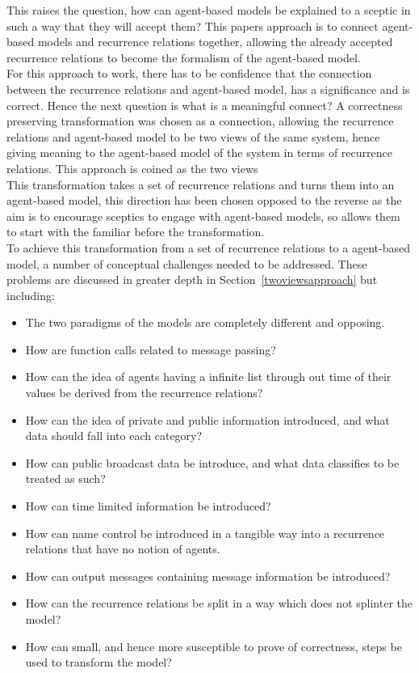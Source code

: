\documentclass{article}
\begin{document}
This raises the question, how can agent-based models be explained to a sceptic in such a way that they will accept them? This papers approach is to connect agent-based models and recurrence relations together, allowing the already accepted recurrence relations to become the formalism of the agent-based model.\\ 
For this approach to work, there has to be confidence that the connection between the recurrence relations and agent-based model, has a significance and is correct. Hence the next question is what is a meaningful connect? A correctness preserving transformation was chosen as a connection, allowing the recurrence relations and agent-based model to be two views of the same system, hence giving meaning to the agent-based model of the system in terms of recurrence relations. This approach is coined as the two views \\    
This transformation takes a set of recurrence relations and turns them into an agent-based model, this direction has been chosen opposed to the reverse as the aim is to encourage sceptics to engage with agent-based models, so allows them to start with the familiar before the transformation.\\ 
To achieve this transformation from a set of recurrence relations to a agent-based model, a number of conceptual challenges needed to be addressed. These problems are discussed in greater depth in Section~\ref{twoviewsapproach} but including: 
\begin{itemize}
   \item The two paradigms of the models are completely different and opposing. 
   \item How are function calls related to message passing?
   \item How can the idea of agents having a infinite list through out time of their values be derived from the recurrence relations? 
   \item How can the idea of private and public information introduced, and what data should fall into each category? 
   \item How can public broadcast data be introduce, and what data classifies to be treated as such? 
   \item How can time limited information be introduced?
   \item How can name control be introduced in a tangible way into a recurrence relations that have no notion of agents. 
   \item How can output messages containing message information be introduced? 
   \item How can the recurrence relations be split in a way which does not splinter the model? 
   \item How can small, and hence more susceptible to prove of correctness, steps be used to transform the model? 
\end{itemize}
\end{document}
